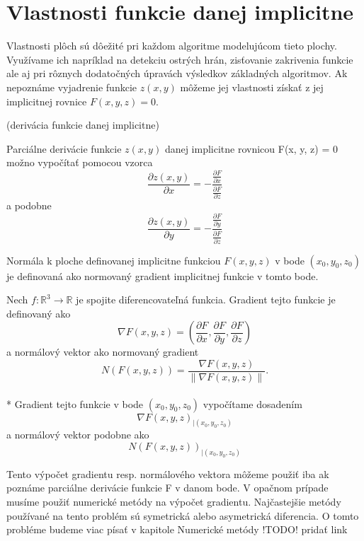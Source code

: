 \newpage

\section{Vlastnosti funkcie danej implicitne}

Vlastnosti plôch sú dôežité pri každom algoritme modelujúcom tieto plochy. Využívame ich napríklad na detekciu ostrých hrán, 
zisťovanie zakrivenia funkcie ale aj pri rôznych dodatočných úpravách výsledkov základných algoritmov.
Ak nepoznáme vyjadrenie funkcie $z(x, y)$ môžeme jej vlastnosti získať z jej implicitnej rovnice $F(x, y, z) = 0$.


\begin{theorem}
    (derivácia funkcie danej implicitne)

    Parciálne derivácie funkcie $z(x, y)$ danej implicitne rovnicou F(x, y, z) = 0 možno vypočítať pomocou vzorca
    $$\frac{\partial z(x, y)}{\partial x} = -\frac{\frac{\partial F}{\partial x}}{\frac{\partial F}{\partial z}}$$
    a podobne 
    $$\frac{\partial z(x, y)}{\partial y} = -\frac{\frac{\partial F}{\partial y}}{\frac{\partial F}{\partial z}}$$
\end{theorem}

Normála k ploche definovanej implicitne funkciou $F(x,y,z)$ v bode $(x_0, y_0, z_0)$ je definovaná ako normovaný 
gradient implicitnej funkcie  v tomto bode.

\begin{definition}
    Nech $f : \mathbb{R}^3 \to \mathbb{R}$ je spojite diferencovateľná funkcia. Gradient tejto 
    funkcie je definovaný ako 
    $$\nabla F(x, y, z) = (\frac{\partial F}{\partial x}, \frac{\partial F}{\partial y}, \frac{\partial F}{\partial z})$$
    a normálový vektor ako normovaný gradient
    $$N(F(x, y, z))  = \frac{\nabla F(x, y, z)}{\| \nabla F(x, y, z) \|}.$$
    \\*
    Gradient tejto funkcie v bode $(x_0, y_0, z_0)$ vypočítame dosadením $$\nabla F(x, y, z)_{\big|(x_0, y_0, z_0)}$$ 
    a normálový vektor podobne ako $$N(F(x, y, z))_{\big|(x_0, y_0, z_0)}$$
\end{definition}

Tento výpočet gradientu resp. normálového vektora môžeme použiť iba ak poznáme parciálne derivácie funkcie F v danom bode.
V opačnom prípade musíme použiť numerické metódy na výpočet gradientu. Najčastejšie metódy používané na tento problém sú 
symetrická alebo asymetrická diferencia. O tomto probléme budeme viac písať v kapitole Numerické metódy !TODO! pridať link 


